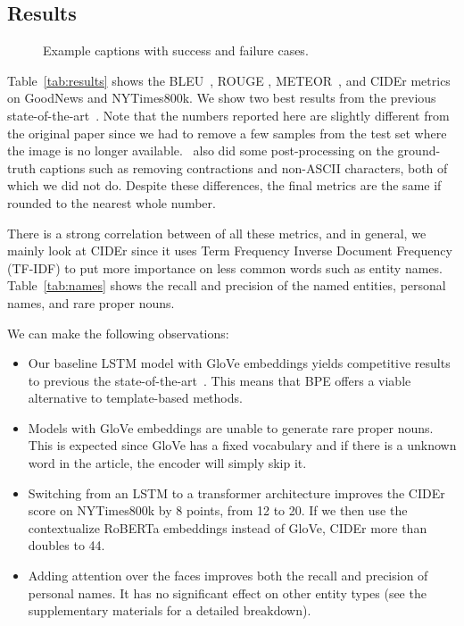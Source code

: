 \subsection{Results}

\begin{figure*}[t]
   \begin{center}
   \fbox{\rule{0pt}{3in} \rule{.9\linewidth}{0pt}}
   \end{center}
      \caption{Example captions with success and failure cases.}
   \label{fig:short}
\end{figure*}


Table~\ref{tab:results} shows the BLEU~\cite{Papineni2002Bleu}, ROUGE
\cite{Lin2004ROUGE}, METEOR~\cite{Denkowski2014Meteor}, and CIDEr
\cite{Vedantam2015CIDEr} metrics on GoodNews and NYTimes800k. We show two best
results from the previous state-of-the-art~\cite{Biten2019GoodNews}. Note that
the numbers reported here are slightly different from the original paper since
we had to remove a few samples from the test set where the image is no longer
available.~\cite{Biten2019GoodNews} also did some post-processing on the
ground-truth captions such as removing contractions and non-ASCII characters,
both of which we did not do. Despite these differences, the final metrics
are the same if rounded to the nearest whole number.

There is a strong correlation between of all these metrics, and in general, we
mainly look at CIDEr since it uses Term Frequency Inverse Document Frequency
(TF-IDF) to put more importance on less common words such as entity names.
Table~\ref{tab:names} shows the recall and precision of the named entities,
personal names, and rare proper nouns.

We can make the following observations:

\begin{itemize}
   \item Our baseline LSTM model with GloVe embeddings yields competitive
   results to previous the state-of-the-art~\cite{Biten2019GoodNews}. This
   means that BPE offers a viable alternative to template-based methods.

   \item Models with GloVe embeddings are unable to generate rare proper nouns.
   This is expected since GloVe has a fixed vocabulary and if there is a
   unknown word in the article, the encoder will simply skip it.

   \item Switching from an LSTM to a transformer architecture improves the
   CIDEr score on NYTimes800k by 8 points, from 12 to 20. If we then use the
   contextualize RoBERTa embeddings instead of GloVe, CIDEr more than doubles
   to 44.

   \item Adding attention over the faces improves both the recall and precision
   of personal names. It has no significant effect on other entity types (see
   the supplementary materials for a detailed breakdown).
\end{itemize}


